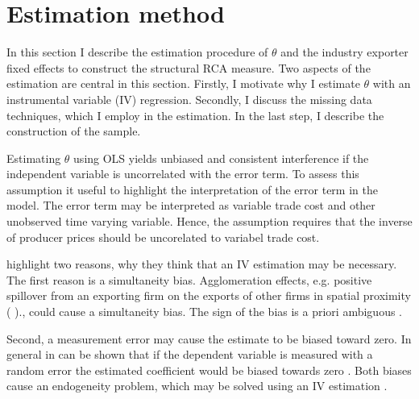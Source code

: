 \section{Estimation method}
In this section I describe the estimation procedure of  $\theta$ and the industry exporter fixed effects  to construct the structural RCA measure.
Two aspects of the estimation are central in this section.
Firstly, I motivate why I estimate $\theta$ with an instrumental variable (IV) regression.
Secondly, I discuss the missing data techniques, which I employ in the estimation.
In the last step, I describe the construction of the sample.
\par %
Estimating  $\theta$ using OLS yields unbiased  and consistent interference if the independent variable is uncorrelated with the error term.
To assess this assumption it useful to highlight the interpretation of the error term in the model.
The error term may be interpreted as variable trade cost and other unobserved time varying variable.
Hence, the assumption requires that the inverse of producer prices should be uncorelated to variabel trade cost.
\par
\textcite{costinot} highlight two reasons, why they think that an IV estimation may be necessary.
The first reason is a simultaneity bias.
Agglomeration effects, e.g. positive spillover from an exporting firm on the exports of other firms in spatial proximity (\cite{bernard2004} )., could cause a simultaneity bias.
The sign of the bias is a priori ambiguous \parencite{costinot}. \par
Second, a measurement error may cause the estimate to be biased toward zero.
In  general in can be shown that if the dependent variable is measured with a random error the estimated coefficient would be biased towards zero \textcite{angrist2008mostly}.
Both biases cause an endogeneity problem, which may be solved using an IV estimation  \parencite[p.139]{Dhaene}. \par
